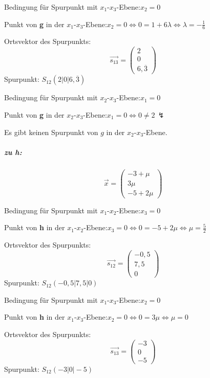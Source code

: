 \documentclass{ajc}
\numberwithin{equation}{subsection}
\begin{document}
	Bedingung für Spurpunkt mit $x_1\text{-}x_3$-Ebene:\quad $x_2 = 0$
	
	Punkt von \textbf{g} in der $x_1\text{-}x_3$-Ebene:\quad $x_2 = 0 \Leftrightarrow 0 = 1 + 6\lambda \Leftrightarrow \lambda = -\frac{1}{6}$
	
	Ortsvektor des Spurpunkts: 
	\begin{equation}
		\overrightarrow{s_\text{13}}=\left(\begin{array}{r} 2 \\ 0 \\ 6,\overline{3}\end{array}\right)
	\end{equation}
	Spurpunkt: $S_\text{12}(2|0|6,\overline{3})$
	
	Bedingung für Spurpunkt mit $x_2$-$x_3$-Ebene:\quad $x_1 = 0$
	
	Punkt von \textbf{g} in der $x_2\text{-}x_3$-Ebene:\quad $x_1 = 0 \Leftrightarrow 0 \ne 2 \,\lightning$
	
	Es gibt keinen Spurpunkt von $g$ in der $x_2\text{-}x_3$-Ebene.
	
	\subparagraph{zu h:}
	\begin{equation}
		\overrightarrow{x}=\left(\begin{array}{r} -3 + \mu \\ 3\mu \\ -5 + 2\mu\end{array}\right)
	\end{equation}
	
	Bedingung für Spurpunkt mit $x_1\text{-}x_2$-Ebene:\quad $x_3 = 0$
	
	Punkt von \textbf{h} in der $x_1\text{-}x_2$-Ebene:\quad $x_3 = 0 \Leftrightarrow 0 = -5 + 2\mu \Leftrightarrow \mu = \frac{5}{2}$
	
	Ortsvektor des Spurpunkts: 
	\begin{equation}
		\overrightarrow{s_\text{12}}=\left(\begin{array}{r} -0,5 \\ 7,5 \\ 0\end{array}\right)
	\end{equation}
	Spurpunkt: $S_\text{12}(-0,5|7,5|0)$
	
	Bedingung für Spurpunkt mit $x_1\text{-}x_3$-Ebene:\quad $x_2 = 0$
	
	Punkt von \textbf{h} in der $x_1\text{-}x_3$-Ebene:\quad $x_2 = 0 \Leftrightarrow 0 = 3\mu \Leftrightarrow \mu = 0$
	
	Ortsvektor des Spurpunkts: 
	\begin{equation}
		\overrightarrow{s_\text{13}}=\left(\begin{array}{r} -3 \\ 0 \\ -5\end{array}\right)
	\end{equation}
	Spurpunkt: $S_\text{12}(-3|0|-5)$
	
\end{document}
